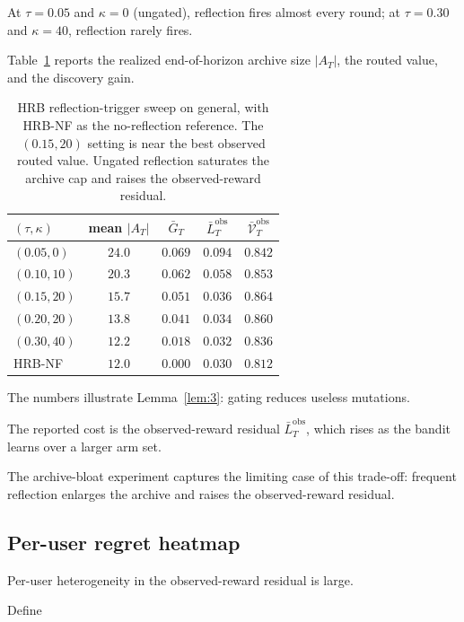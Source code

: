 \documentclass{article} %
\begin{document}
At $\tau=0.05$ and $\kappa=0$ (ungated), reflection fires almost every round; at $\tau=0.30$ and $\kappa=40$, reflection rarely fires.

Table~\ref{tab:app-reflection-sweep} reports the realized end-of-horizon archive size $|A_T|$, the routed value, and the discovery gain.

\begin{table}[h]
\centering
\small
\begin{tabular}{lcccc}
\toprule
$(\tau,\kappa)$ & mean $|A_T|$ & $\bar G_T$ & $\bar L_T^{\mathrm{obs}}$ & $\bar{\mathcal V}_T^{\mathrm{obs}}$ \\
\midrule
$(0.05,0)$    & $24.0$ & $0.069$ & $0.094$ & $0.842$ \\
$(0.10,10)$   & $20.3$ & $0.062$ & $0.058$ & $0.853$ \\
$(0.15,20)$   & $15.7$ & $0.051$ & $0.036$ & $0.864$ \\
$(0.20,20)$   & $13.8$ & $0.041$ & $0.034$ & $0.860$ \\
$(0.30,40)$   & $12.2$ & $0.018$ & $0.032$ & $0.836$ \\
HRB-NF       & $12.0$ & $0.000$ & $0.030$ & $0.812$ \\
\bottomrule
\end{tabular}
\caption{HRB reflection-trigger sweep on general, with HRB-NF as the
no-reflection reference. The \((0.15,20)\) setting is
near the best observed routed value. Ungated reflection saturates the archive
cap and raises the observed-reward residual.}
\label{tab:app-reflection-sweep}
\end{table}

The numbers illustrate Lemma~\ref{lem:3}: gating reduces useless mutations.

The reported cost is the observed-reward residual
\(\bar L_T^{\mathrm{obs}}\), which rises as the bandit learns over a larger arm
set.

The archive-bloat experiment captures the limiting case of this trade-off: frequent reflection enlarges the archive and raises the observed-reward residual.

\subsection{Per-user regret heatmap}

\label{app:per-user-regret}

Per-user heterogeneity in the observed-reward residual is large.

Define
\end{document}
